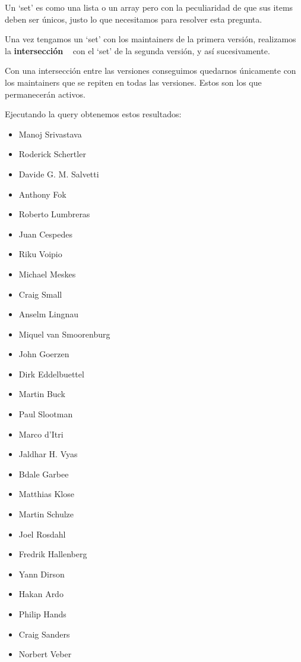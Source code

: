 \documentclass[a4paper, 12pt]{book}
\begin{document}
Un `set' es como una lista o un array pero con la peculiaridad de que sus items deben ser únicos, justo lo que necesitamos para resolver esta pregunta.

Una vez tengamos un `set' con los maintainers de la primera versión, realizamos la \textbf{intersección} ~\cite{medium:_intersection} con el `set' de la segunda versión, y así sucesivamente. 

Con una intersección entre las versiones conseguimos quedarnos únicamente con los maintainers que se repiten en todas las versiones. Estos son los que permanecerán activos.

Ejecutando la query obtenemos estos resultados:
\begin{multicols}{3}
	\begin{itemize}
		\item Manoj Srivastava
		\item Roderick Schertler
		\item Davide G. M. Salvetti
		\item Anthony Fok
		\item Roberto Lumbreras
		\item Juan Cespedes
		\item Riku Voipio
		\item Michael Meskes
		\item Craig Small
		\item Anselm Lingnau
		\item Miquel van Smoorenburg
		\item John Goerzen
		\item Dirk Eddelbuettel
		\item Martin Buck
		\item Paul Slootman
		\item Marco d'Itri
		\item Jaldhar H. Vyas
		\item Bdale Garbee
		\item Matthias Klose
		\item Martin Schulze
		\item Joel Rosdahl
		\item Fredrik Hallenberg
		\item Yann Dirson
		\item Hakan Ardo
		\item Philip Hands
		\item Craig Sanders
		\item Norbert Veber
	\end{itemize}
\end{multicols}
\end{document}
